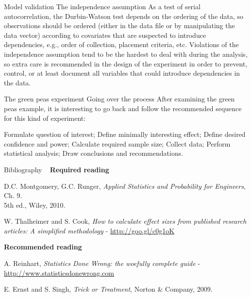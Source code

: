 \documentclass[t]{beamer}
\begin{document}

\begin{ftstf}
{Model validation}
{The independence assumption}
As a test of serial autocorrelation, the Durbin-Watson test depends on the ordering of the data, so observations should be ordered (either in the data file or by manipulating the data vector) according to covariates that are suspected to introduce dependencies, e.g., order of collection, placement criteria, etc.
\vone
Violations of the independence assumption tend to be the hardest to deal with during the analysis, so extra care is recommended in the design of the experiment in order to prevent, control, or at least document all variables that could introduce dependencies in the data.
\end{ftstf}


\begin{ftst}
{The green peas experiment}
{Going over the process}
After examining the green peas example, it is interesting to go back and follow the recommended sequence for this kind of experiment:

\bitems Formulate question of interest;
	\spitem Define minimally interesting effect;
	\spitem Define desired confidence and power;
	\spitem Calculate required sample size;
	\spitem Collect data;
	\spitem Perform statistical analysis;
	\spitem Draw conclusions and recommendations.
\eitem
{}
\end{ftst}



\begin{ftst}
{Bibliography}
{\ }
\scriptsize
\textbf{Required reading}

\benums D.C. Montgomery, G.C. Runger, \textit{Applied Statistics and Probability for Engineers}, Ch. 9.\\5th ed., Wiley, 2010. 
\item W. Thalheimer and S. Cook, \textit{How to calculate effect sizes from published research articles: A simplified methodology} - {\tiny\url{http://goo.gl/c0g1oK}}
\eenum

\textbf{Recommended reading}

\benums A. Reinhart, \textit{Statistics Done Wrong: the woefully complete guide} - {\tiny\url{http://www.statisticsdonewrong.com}}
\item E. Ernst and S. Singh, \textit{Trick or Treatment}, Norton \& Company, 2009.
\eenum
\end{ftst}
\end{document}
